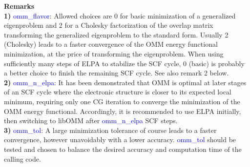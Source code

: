 \documentclass{report}
\begin{document}
\bigskip
\textbf{Remarks}\\

\textbf{1)} \textcolor{blue}{omm\_flavor}:  Allowed choices are 0 for basic minimization of a generalized eigenproblem and 2 for a Cholesky factorization of the overlap matrix transforming the generalized eigenproblem to the standard form.  Usually 2 (Cholesky) leads to a faster convergence of the OMM energy functional minimization, at the price of transforming the eigenproblem.  When using sufficiently many steps of ELPA to stabilize the SCF cycle, 0 (basic) is probably a better choice to finish the remaining SCF cycle.  See also remark 2 below.\\

\textbf{2)} \textcolor{blue}{omm\_n\_elpa}:  It has been demonstrated that OMM is optimal at later stages of an SCF cycle where the electronic structure is closer to its expected local minimum, requiring only one CG iteration to converge the minimization of the OMM energy functional.  Accordingly, it is recommended to use ELPA initially, then switching to libOMM after \textcolor{blue}{omm\_n\_elpa} SCF steps.\\

\textbf{3)} \textcolor{blue}{omm\_tol}:  A large minimization tolerance of course leads to a faster convergence, however unavoidably with a lower accuracy.  \textcolor{blue}{omm\_tol} should be tested and chosen to balance the desired accuracy and computation time of the calling code.\\
\end{document}
